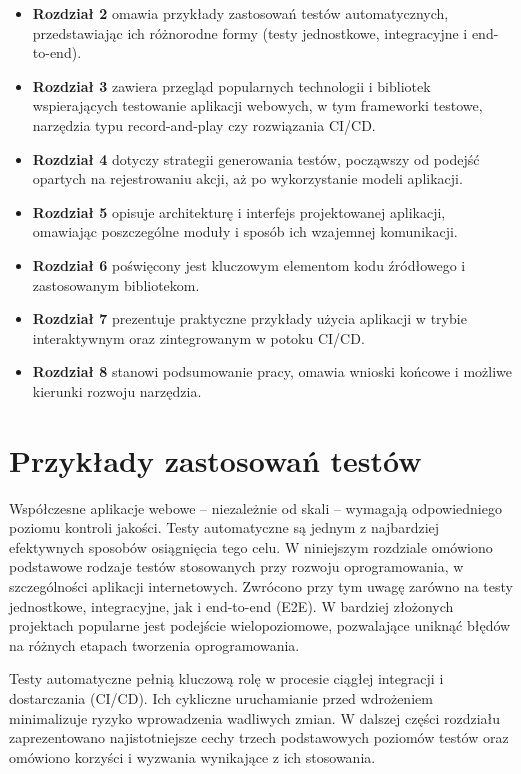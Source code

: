 \documentclass[12pt]{report}
\begin{document}
\begin{itemize}
    \item \textbf{Rozdział 2} omawia przykłady zastosowań testów automatycznych, przedstawiając ich różnorodne formy (testy jednostkowe, integracyjne i end-to-end).
    \item \textbf{Rozdział 3} zawiera przegląd popularnych technologii i bibliotek wspierających testowanie aplikacji webowych, w tym frameworki testowe, narzędzia typu record-and-play czy rozwiązania CI/CD.
    \item \textbf{Rozdział 4} dotyczy strategii generowania testów, począwszy od podejść opartych na rejestrowaniu akcji, aż po wykorzystanie modeli aplikacji.
    \item \textbf{Rozdział 5} opisuje architekturę i interfejs projektowanej aplikacji, omawiając poszczególne moduły i sposób ich wzajemnej komunikacji.
    \item \textbf{Rozdział 6} poświęcony jest kluczowym elementom kodu źródłowego i zastosowanym bibliotekom.
    \item \textbf{Rozdział 7} prezentuje praktyczne przykłady użycia aplikacji w trybie interaktywnym oraz zintegrowanym w potoku CI/CD.
    \item \textbf{Rozdział 8} stanowi podsumowanie pracy, omawia wnioski końcowe i możliwe kierunki rozwoju narzędzia.
\end{itemize}

\chapter{Przykłady zastosowań testów}
\label{chap:przyklady-testow}
Współczesne aplikacje webowe -- niezależnie od skali -- wymagają odpowiedniego poziomu kontroli jakości. Testy automatyczne są jednym z najbardziej efektywnych sposobów osiągnięcia tego celu. W niniejszym rozdziale omówiono podstawowe rodzaje testów stosowanych przy rozwoju oprogramowania, w szczególności aplikacji internetowych. Zwrócono przy tym uwagę zarówno na testy jednostkowe, integracyjne, jak i end-to-end (E2E). W bardziej złożonych projektach popularne jest podejście wielopoziomowe, pozwalające uniknąć błędów na różnych etapach tworzenia oprogramowania.

Testy automatyczne pełnią kluczową rolę w procesie ciągłej integracji i dostarczania (CI/CD). Ich cykliczne uruchamianie przed wdrożeniem minimalizuje ryzyko wprowadzenia wadliwych zmian. W dalszej części rozdziału zaprezentowano najistotniejsze cechy trzech podstawowych poziomów testów oraz omówiono korzyści i wyzwania wynikające z ich stosowania.
\end{document}
